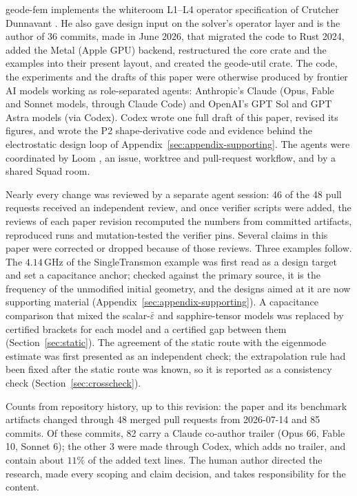 \documentclass{anvil-paper}
\begin{document}
geode-fem implements the whiteroom L1--L4 operator specification of
Crutcher Dunnavant \citep{dunnavant2026whiteroom}. He also gave design
input on the solver's operator layer and is the author of 36 commits, made
in June 2026, that migrated the code to Rust 2024, added the Metal (Apple
GPU) backend, restructured the core crate and the examples into their
present layout, and created the geode-util crate. The code, the experiments and the drafts of
this paper were otherwise produced by frontier AI models working as
role-separated agents: Anthropic's Claude (Opus, Fable and Sonnet models,
through Claude Code) and OpenAI's GPT Sol and GPT Astra models (via
Codex). Codex wrote one full draft of this paper, revised its figures, and
wrote the P2 shape-derivative code and evidence behind the electrostatic
design loop of Appendix~\ref{sec:appendix-supporting}. The agents were
coordinated by Loom \citep{loom}, an issue, worktree and pull-request
workflow, and by a shared Squad room.

Nearly every change was reviewed by a separate agent session: 46 of the
48 pull requests received an independent review, and once verifier
scripts were added, the reviews of each paper revision recomputed the
numbers from committed artifacts, reproduced runs and mutation-tested the
verifier pins. Several
claims in this paper were corrected or dropped because of those reviews.
Three examples follow. The $4.14$\,GHz of the
SingleTransmon example was first read as a design target and set a
capacitance anchor; checked against the primary source, it is the
frequency of the unmodified initial geometry, and the designs aimed at it
are now supporting material (Appendix~\ref{sec:appendix-supporting}). A
capacitance comparison that mixed the scalar-$\bar\varepsilon$ and
sapphire-tensor models was replaced by certified brackets for each model
and a certified gap between them (Section~\ref{sec:static}). The agreement
of the static route with the eigenmode estimate was first presented as an
independent check; the extrapolation rule had been fixed after the static
route was known, so it is reported as a consistency check
(Section~\ref{sec:crosscheck}).

Counts from repository history, up to this revision: the paper and its
benchmark artifacts changed through 48 merged pull requests from
2026-07-14 and 85 commits. Of these commits, 82 carry a Claude co-author
trailer (Opus 66, Fable 10, Sonnet 6); the other 3 were made through
Codex, which adds no trailer, and contain about $11\%$ of the added text
lines. The human author directed the research, made every scoping and
claim decision, and takes responsibility for the content.
\end{document}
